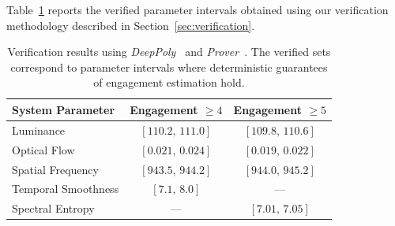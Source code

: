 \documentclass[review]{vgtc}                 %
\begin{document}
Table~\ref{tab:core-verification} reports the verified parameter intervals obtained using our verification methodology described in Section~\ref{sec:verification}. 
%
%
\begin{table}[t]
\centering
\caption{Verification results using \textit{DeepPoly~\cite{deeppoly}} and \textit{Prover~\cite{prover}}. 
The verified sets correspond to parameter intervals where deterministic 
guarantees of engagement estimation hold.}
\vspace{1ex}
\begin{tabular}{lcc}
\toprule
\textbf{System Parameter} & \textbf{Engagement $\geq 4$} & \textbf{Engagement $\geq 5$} \\
\midrule
Luminance          & $[110.2,\,111.0]$ & $[109.8,\,110.6]$ \\
Optical Flow       & $[0.021,\,0.024]$ & $[0.019,\,0.022]$ \\
Spatial Frequency  & $[943.5,\,944.2]$ & $[944.0,\,945.2]$ \\
Temporal Smoothness & $[7.1,\,8.0]$     & --- \\
Spectral Entropy   & ---                & $[7.01,\,7.05]$ \\
\bottomrule
\end{tabular}
\label{tab:core-verification}
\end{table}
\end{document}
